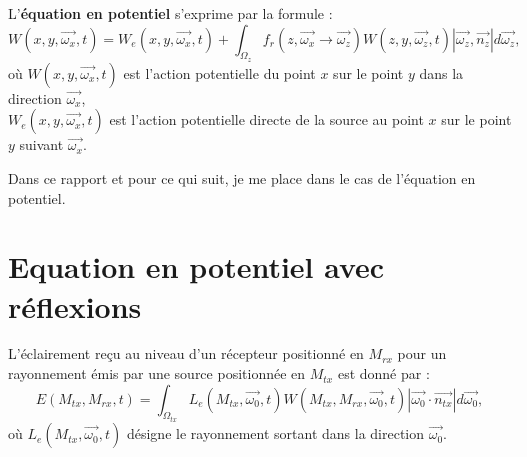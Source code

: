 L'\textbf{équation en potentiel} s'exprime par la formule :
\large \begin{equation} \label{eq:LTE_potentiel}
    W(x, y, \overrightarrow{\omega_x}, t) =
        W_e(x, y, \overrightarrow{\omega_x}, t) +
        \int_{\Omega_z}
            f_r(z, \overrightarrow{\omega_x} \longrightarrow \overrightarrow{\omega_z})
            W(z, y, \overrightarrow{\omega_z}, t)
            |\overrightarrow{\omega_z}, \overrightarrow{n_z} |
        d\overrightarrow{\omega_z}
,\end{equation} \normalsize
où $W(x, y, \overrightarrow{\omega_x}, t)$ est l'action potentielle du point $x$ sur le point $y$ dans la direction $\overrightarrow{\omega_x}$, \\
$ W_e(x, y, \overrightarrow{\omega_x}, t)$ est l'action potentielle directe de la source au point $x$ sur le point $y$ suivant $\overrightarrow{\omega_x}$.\par
Dans ce rapport et pour ce qui suit, je me place dans le cas de l'équation en potentiel.

\section{Equation en potentiel avec réflexions}

L'éclairement reçu au niveau d'un récepteur positionné en $M_{rx}$ pour un rayonnement émis par une source positionnée en $M_{tx}$ est donné par :
\large \begin{equation}
    E(M_{tx}, M_{rx}, t) =
        \int_{\Omega_{tx}}
            L_e(M_{tx}, \overrightarrow{\omega_0}, t)
            W(M_{tx}, M_{rx}, \overrightarrow{\omega_0}, t)
            | \overrightarrow{\omega_0} \cdot \overrightarrow{n_{tx}} |
        d\overrightarrow{\omega_0}
,\end{equation} \normalsize
où $L_e(M_{tx}, \overrightarrow{\omega_0}, t)$ désigne le rayonnement sortant dans la direction $\overrightarrow{\omega_0}$.\newline\par

